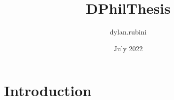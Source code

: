 \documentclass{article}
\title{DPhilThesis}
\author{dylan.rubini }
\date{July 2022}
\begin{document}
\maketitle

\section{Introduction}
\end{document}
